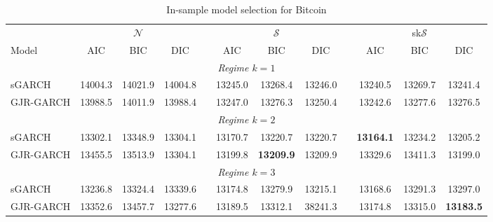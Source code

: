 \documentclass[12pt,a4paper]{article}
\begin{document}
\begin{landscape}
\begin{table}[]
\center
\begin{threeparttable}
\caption{In-sample model selection for Bitcoin}
\label{table:aicbic}
\begin{tabular}{lccclccclccc}
\hline
          & \multicolumn{3}{c}{$\mathcal{N}$} & \multicolumn{1}{c}{} & \multicolumn{3}{c}{$\mathcal{S}$}    &                      & \multicolumn{3}{c}{sk$\mathcal{S}$}          \\
Model     & AIC       & BIC       & DIC       & \multicolumn{1}{c}{} & AIC     & BIC              & DIC     & \multicolumn{1}{c}{} & AIC              & BIC     & DIC              \\ \hline
\multicolumn{12}{c}{\textit{Regime $k=1$}}                                                                                                                                         \\
sGARCH    & 14004.3   & 14021.9   & 14004.8   &                      & 13245.0 & 13268.4          & 13246.0 &                      & 13240.5          & 13269.7 & 13241.4          \\
GJR-GARCH & 13988.5   & 14011.9   & 13988.4   &                      & 13247.0 & 13276.3          & 13250.4 &                      & 13242.6          & 13277.6 & 13276.5          \\
\multicolumn{12}{c}{\textit{Regime $k=2$}}                                                                                                                                         \\
sGARCH    & 13302.1   & 13348.9   & 13304.1   &                      & 13170.7 & 13220.7          & 13220.7 &                      & \textbf{13164.1} & 13234.2 & 13205.2          \\
GJR-GARCH & 13455.5   & 13513.9   & 13304.1   &                      & 13199.8 & \textbf{13209.9} & 13209.9 &                      & 13329.6          & 13411.3 & 13199.0          \\
\multicolumn{12}{c}{\textit{Regime $k=3$}}                                                                                                                                         \\
sGARCH    & 13236.8   & 13324.4   & 13339.6   &                      & 13174.8 & 13279.9          & 13215.1 &                      & 13168.6 & 13291.3 & 13297.0          \\
GJR-GARCH & 13352.6   & 13457.7   & 13277.6   &                      & 13189.5 & 13312.1          & 38241.3 &                      & 13174.8          & 13315.0 & \textbf{13183.5} \\ \hline

\end{tabular}
\end{threeparttable}
\end{table}
\end{landscape}
\end{document}
